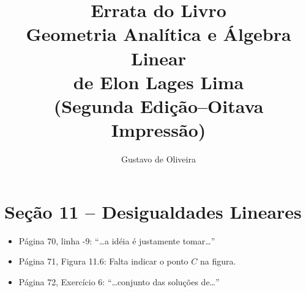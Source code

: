 \documentclass[a4paper,11pt]{article}
\title{Errata do Livro\\Geometria Analítica e Álgebra Linear\\de Elon Lages Lima\\(Segunda Edição--Oitava Impressão)}
\author{Gustavo de Oliveira}
\begin{document}
\maketitle

\section*{Seção 11 -- Desigualdades Lineares}

\begin{itemize}
  \item
    Página 70, linha -9: ``\dots a idéia é justamente tomar\dots''
  \item
    Página 71, Figura 11.6: Falta indicar o ponto $C$ na figura.
  \item
    Página 72, Exercício 6: ``\dots conjunto das soluções de\dots''
\end{itemize}
\end{document}
